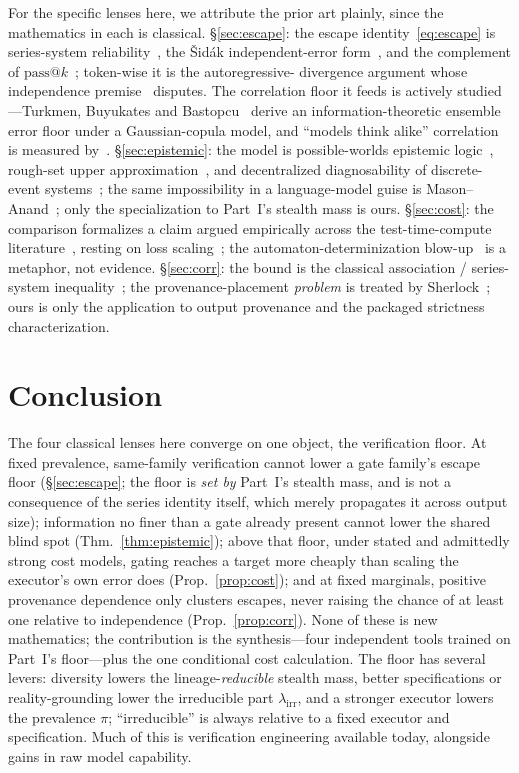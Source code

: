 \documentclass[11pt]{article}
\theoremstyle{definition}
\theoremstyle{remark}
\newcommand{\lirr}{\lambda_{\mathrm{irr}}}
\begin{document}
For the specific lenses here, we attribute the prior art plainly, since the mathematics in each is
classical. \S\ref{sec:escape}: the escape identity~\eqref{eq:escape} is series-system
reliability~\cite{barlowproschan1965}, the \v{S}id\'ak independent-error form~\cite{sidak1967}, and the
complement of $\mathrm{pass}@k$~\cite{chen2021,brown2024}; token-wise it is the autoregressive-%
divergence argument whose independence premise~\cite{arbuzov2025} disputes. The correlation floor it
feeds is actively studied---Turkmen, Buyukates and Bastopcu~\cite{turkmen2026} derive an
information-theoretic ensemble error floor under a Gaussian-copula model, and ``models think alike''
correlation is measured by~\cite{goel2025,kim2025}. \S\ref{sec:epistemic}: the model is possible-worlds
epistemic logic~\cite{fagin1995,halpernmoses1990}, rough-set upper approximation~\cite{pawlak1982}, and
decentralized diagnosability of discrete-event systems~\cite{sampath1995,debouk2000,descodiag2024}; the
same impossibility in a language-model guise is Mason--Anand~\cite{masonanand2026}; only the
specialization to Part~I's stealth mass is ours. \S\ref{sec:cost}: the comparison formalizes a claim
argued empirically across the test-time-compute literature~\cite{snell2024,lifshitz2025,scalingverif2026},
resting on loss scaling~\cite{kaplan2020,hoffmann2022}; the automaton-determinization
blow-up~\cite{rabinscott1959,meyerfischer1971} is a metaphor, not evidence. \S\ref{sec:corr}: the
bound is the classical association / series-system inequality~\cite{esary1967,harris1960,fkg1971,barlowproschan1965};
the provenance-placement \emph{problem} is treated by Sherlock~\cite{ro2025sherlock}; ours is only the
application to output provenance and the packaged strictness characterization.

\section{Conclusion}
The four classical lenses here converge on one object, the verification floor. At fixed prevalence,
same-family verification cannot lower a gate family's escape floor (\S\ref{sec:escape}; the floor is
\emph{set by} Part~I's stealth mass, and is not a consequence of the series identity itself, which
merely propagates it across output size); information no finer than a gate already present cannot lower the shared blind spot
(Thm.~\ref{thm:epistemic}); above that floor, under stated and admittedly strong cost models, gating
reaches a target more cheaply than scaling the executor's own error does (Prop.~\ref{prop:cost}); and
at fixed marginals, positive provenance dependence only clusters escapes, never raising the chance of
at least one relative to independence (Prop.~\ref{prop:corr}). None of these is new mathematics; the
contribution is the synthesis---four independent tools trained on Part~I's floor---plus the one
conditional cost calculation. The floor has several levers: diversity lowers the lineage-\emph{reducible}
stealth mass, better specifications or reality-grounding lower the irreducible part $\lirr$, and a
stronger executor lowers the prevalence $\pi$; ``irreducible'' is always relative to a fixed executor
and specification. Much of this is verification engineering available today, alongside gains in raw
model capability.
\end{document}

